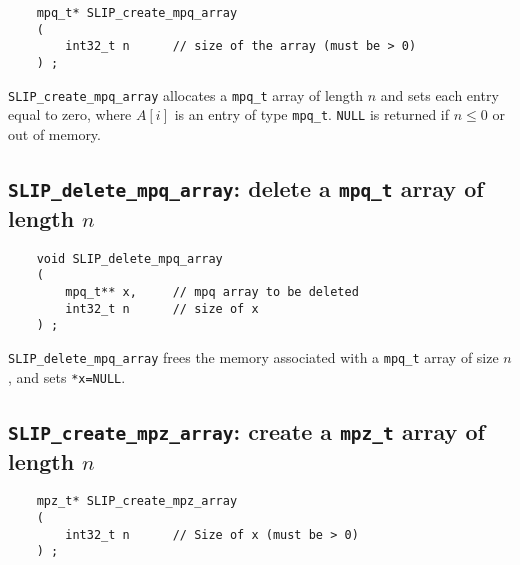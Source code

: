 \documentclass[12pt]{article}
\theoremstyle{definition}
\begin{document}
\begin{mdframed}[userdefinedwidth=6in]
{\footnotesize
\begin{verbatim}
    mpq_t* SLIP_create_mpq_array
    (
        int32_t n      // size of the array (must be > 0)
    ) ;
\end{verbatim}
} \end{mdframed}


\verb|SLIP_create_mpq_array| allocates a \verb|mpq_t| array of length $n$ and
sets each entry equal to zero, where  $A[i]$ is an entry of type \verb|mpq_t|.
 \verb|NULL| is returned if
$n\le 0$ or out of memory.

\cprotect\subsection{\verb|SLIP_delete_mpq_array|: delete a \verb|mpq_t| array of length $n$}

\begin{mdframed}[userdefinedwidth=6in]
{\footnotesize
\begin{verbatim}
    void SLIP_delete_mpq_array
    (
        mpq_t** x,     // mpq array to be deleted
        int32_t n      // size of x
    ) ;
\end{verbatim}
} \end{mdframed}


\verb|SLIP_delete_mpq_array| frees the memory associated with a \verb|mpq_t|
array of size $n$, and sets \verb|*x=NULL|.

\cprotect\subsection{\verb|SLIP_create_mpz_array|: create a \verb|mpz_t| array of length $n$}
\label{ss:create_mpz_array}

\begin{mdframed}[userdefinedwidth=6in]
{\footnotesize
\begin{verbatim}
    mpz_t* SLIP_create_mpz_array
    (
        int32_t n      // Size of x (must be > 0)
    ) ;
\end{verbatim}
} \end{mdframed}
\end{document}
